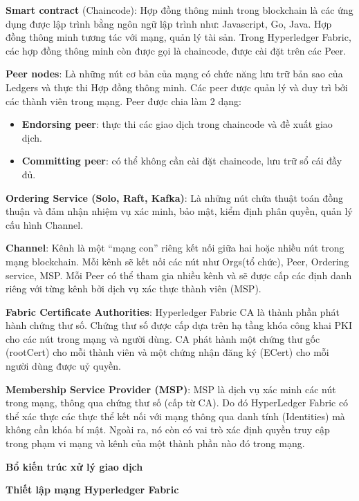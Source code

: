 \textbf{Smart contract} (Chaincode): Hợp đồng thông minh trong blockchain là các ứng dụng được lập trình bằng ngôn ngữ lập trình như: Javascript, Go, Java. Hợp đồng thông minh tương tác với mạng, quản lý tài sản. Trong Hyperledger Fabric, các hợp đồng thông minh còn được gọi là chaincode, được cài đặt trên các Peer.

\textbf{Peer nodes}: Là những nút cơ bản của mạng có chức năng lưu trữ bản sao của Ledgers và thực thi Hợp đồng thông minh. Các peer được quản lý và duy trì bởi các thành viên trong mạng. Peer được chia làm 2 dạng:

\begin{itemize}
\item \textbf{Endorsing peer}: thực thi các giao dịch trong chaincode và đề xuất giao dịch.
\item \textbf{Committing peer}: có thể không cần cài đặt chaincode, lưu trữ sổ cái đầy đủ.
\end{itemize}

\textbf{Ordering Service (Solo, Raft, Kafka)}: Là những nút chứa thuật toán đồng thuận và đảm nhận nhiệm vụ xác minh, bảo mật, kiểm định phân quyền, quản lý cấu hình Channel.

\textbf{Channel}: Kênh là một “mạng con” riêng kết nối giữa hai hoặc nhiều nút trong mạng blockchain. Mỗi kênh sẽ kết nối các nút như Orgs(tổ chức), Peer, Ordering service, MSP. Mỗi Peer có thể tham gia nhiều kênh và sẽ được cấp các định danh riêng với từng kênh bởi dịch vụ xác thực thành viên (MSP).

\textbf{Fabric Certificate Authorities}: Hyperledger Fabric CA là thành phần phát hành chứng thư số. Chứng thư số được cấp dựa trên hạ tầng khóa công khai PKI cho các nút trong mạng và người dùng. CA phát hành một chứng thư gốc (rootCert) cho mỗi thành viên và một chứng nhận đăng ký (ECert) cho mỗi người dùng được uỷ quyền.

\textbf{Membership Service Provider (MSP)}: MSP là dịch vụ xác minh các nút trong mạng, thông qua chứng thư số (cấp từ CA). Do đó HyperLedger Fabric có thể xác thực các thực thể kết nối với mạng thông qua danh tính (Identities) mà không cần khóa bí mật. Ngoài ra, nó còn có vai trò xác định quyền truy cập trong phạm vi mạng và kênh của một thành phần nào đó trong mạng.

\textbf{Bổ kiến trúc xử lý giao dịch}

\textbf{Thiết lập mạng Hyperledger Fabric}

